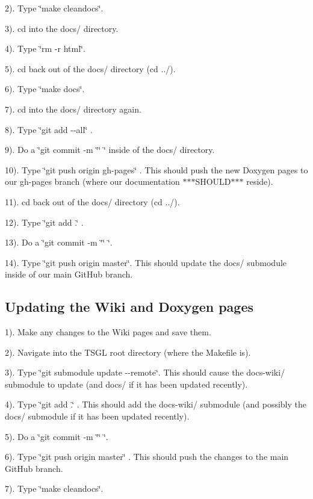 2). Type \char`\"{}make cleandocs\char`\"{}.

3). cd into the docs/ directory.

4). Type \char`\"{}rm -\/r html\char`\"{}.

5). cd back out of the docs/ directory (cd ../).

6). Type \char`\"{}make docs\char`\"{}.

7). cd into the docs/ directory again.

8). Type \char`\"{}git add -\/-\/all\char`\"{} .

9). Do a \char`\"{}git commit -\/m \char`\"{}\char`\"{} \char`\"{} inside of the docs/ directory.

10). Type \char`\"{}git push origin gh-\/pages\char`\"{} . This should push the new Doxygen pages to our gh-\/pages branch (where our documentation $\ast$$\ast$$\ast$\-S\-H\-O\-U\-L\-D$\ast$$\ast$$\ast$ reside).

11). cd back out of the docs/ directory (cd ../).

12). Type \char`\"{}git add .\char`\"{} .

13). Do a \char`\"{}git commit -\/m \char`\"{}\char`\"{} \char`\"{}.

14). Type \char`\"{}git push origin master\char`\"{}. This should update the docs/ submodule inside of our main Git\-Hub branch.

\subsection*{Updating the Wiki and Doxygen pages}

1). Make any changes to the Wiki pages and save them.

2). Navigate into the T\-S\-G\-L root directory (where the Makefile is).

3). Type \char`\"{}git submodule update -\/-\/remote\char`\"{}. This should cause the docs-\/wiki/ submodule to update (and docs/ if it has been updated recently).

4). Type \char`\"{}git add .\char`\"{} . This should add the docs-\/wiki/ submodule (and possibly the docs/ submodule if it has been updated recently).

5). Do a \char`\"{}git commit -\/m \char`\"{}\char`\"{} \char`\"{}.

6). Type \char`\"{}git push origin master\char`\"{} . This should push the changes to the main Git\-Hub branch.

7). Type \char`\"{}make cleandocs\char`\"{}.

